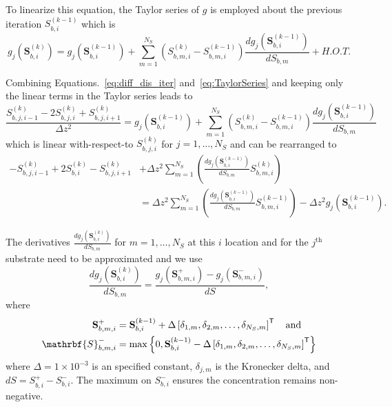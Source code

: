 \documentclass[letterpaper, twoside]{article}
\numberwithin{equation}{section}
\begin{document}
To linearize this equation, the Taylor series of $g$ is employed about the previous iteration $S_{b,i}^{(k-1)}$ which is
\begin{equation}\label{eq:TaylorSeries}
  g_j\left(\mathbf{S}_{b,i}^{(k)}\right) =   g_j\left(\mathbf{S}_{b,i}^{(k-1)}\right) + \sum_{m=1}^{N_S} \left( S_{b,m,i}^{(k)} - S_{b,m,i}^{(k-1)}\right) \frac{d g_j\left(\mathbf{S}_{b,i}^{(k-1)}\right)}{d S_{b,m}} + H.O.T.
\end{equation}

Combining Equations.~\ref{eq:diff_dis_iter} and~\ref{eq:TaylorSeries} and keeping only the linear terms in the Taylor series leads to
\begin{equation} \label{eq:diff_linear}
  \frac{ S_{b,j,i-1}^{(k)} - 2 S_{b,j,i}^{(k)} + S_{b,j,i+1}^{(k)}}{\Delta z^2} =  g_j\left(\mathbf{S}_{b,i}^{(k-1)}\right) + \sum_{m=1}^{N_S} \left( S_{b,m,i}^{(k)} - S_{b,m,i}^{(k-1)}\right)  \frac{d g_j\left(\mathbf{S}_{b,i}^{(k-1)}\right)}{d S_{b,m}} 
\end{equation}
which is linear with-respect-to $S_{b,j,i}^{(k)}$ for $j=1,\dots,N_S$ and can be rearranged to
\begin{equation}
  \label{eq:diff_final}
  \begin{split}
    -S_{b,j,i-1}^{(k)} + 2 S_{b,i}^{(k)} - S_{b,j,i+1}^{(k)}
    &+  \Delta z^2\sum_{m=1}^{N_S} \left( \frac{d g_j\left(\mathbf{S}_{b,i}^{(k-1)}\right)}{d S_{b,m}}  S_{b,m,i}^{(k  )}\right)\\
    &=  \Delta z^2\sum_{m=1}^{N_S} \left( \frac{d g_j\left(\mathbf{S}_{b,i}^{(k-1)}\right)}{d S_{b,m}}  S_{b,m,i}^{(k-1)}\right) - \Delta z^2 g_j\left(\mathbf{S}_{b,i}^{(k-1)}\right) .
  \end{split}
\end{equation}

The derivatives $\frac{d g_j\left(\mathbf{S}_{b,i}^{(k)}\right)}{d S_{b,m}}$  for $m=1,\dots,N_S$ at this $i$ location and for the $j^\mathrm{th}$ substrate need to be approximated and we use
\begin{equation}
  \label{eq:dgds}
  \frac{d g_j\left(\mathbf{S}_{b,i}^{(k)}\right)}{d S_{b,m}} = \frac{g_j\left(\mathbf{S}_{b,m,i}^+\right) - g_j\left(\mathbf{S}_{b,m,i}^{-}\right)}{ dS},
\end{equation}
where
\begin{align*}
  \mathbf{S}_{b,m,i}^+&=\mathbf{S}_{b,i}^{(k-1)}+ \Delta \left[\delta_{1,m},\delta_{2,m},\dots,\delta_{N_S,m}\right]^\mathsf{T} \text{\quad and} \\
  \mathrbf{S}_{b,m,i}^-&=\max\left\{0, \mathbf{S}_{b,i}^{(k-1)}- \Delta\left[\delta_{1,m},\delta_{2,m},\dots,\delta_{N_S,m}\right]^\mathsf{T}\right\}
\end{align*}
where $\Delta=1\times 10^{-3}$ is an specified constant, $\delta_{j,m}$ is the Kronecker delta, and $dS = S_{b,i}^+ - S_{b,i}^-$.  The maximum on $S_{b,i}^-$ ensures the concentration remains non-negative.
\end{document}
